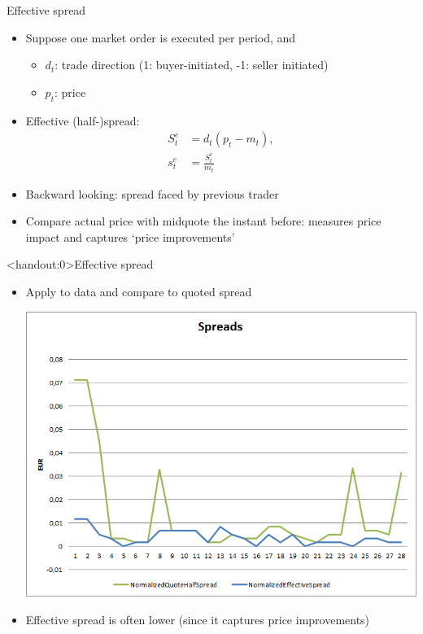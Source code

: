 \documentclass[english,10pt
,aspectratio=169
]{beamer}
\begin{document}
\begin{frame}{Effective spread}
	\begin{itemize}
		\item Suppose one market order is executed per period, and
		\begin{itemize}
			\item $d_t$: trade direction (1: buyer-initiated, -1: seller initiated)
			\item $p_t$:  price
		\end{itemize}
		\item \alert{Effective (half-)spread}: 
		\begin{align*}
		S^e_t & = d_t(p_t-m_{t}), \\
		s^e_t & = \frac{S^e_t}{m_{t}}
		\end{align*}
		\item Backward looking: spread faced by previous trader
		\item Compare actual price with midquote the instant before: measures price impact and captures `price improvements'
	\end{itemize}
\end{frame}


\begin{frame}<handout:0>{Effective spread}
	\begin{itemize}
		\item Apply to data and compare to quoted spread
		\begin{center}
			\includegraphics[scale=0.39]{pics/L2_effectivespread}
		\end{center}
		\item Effective spread is often lower (since it captures price improvements)
	\end{itemize}
\end{frame}
\end{document}
